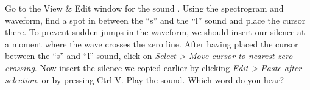 \documentclass[a4paper, 9pt]{article}
\begin{document}
\begin{exercise}
\action Go to the View \& Edit window for the sound .
\action Using the spectrogram and waveform, find a spot in between the ``s'' and the ``l'' sound and place the cursor there.
\action To prevent sudden jumps in the waveform, we should insert our silence at
a moment where the wave crosses the zero line. After having placed the cursor between the ``s'' and ``l'' sound, click on \emph{Select > Move cursor to nearest zero crossing}.
\action Now insert the silence we copied earlier by clicking \emph{Edit > Paste after selection}, or by pressing Ctrl-V.
\action Play the sound. Which word do you hear?
\end{exercise}

\printbibliography
\end{document}
